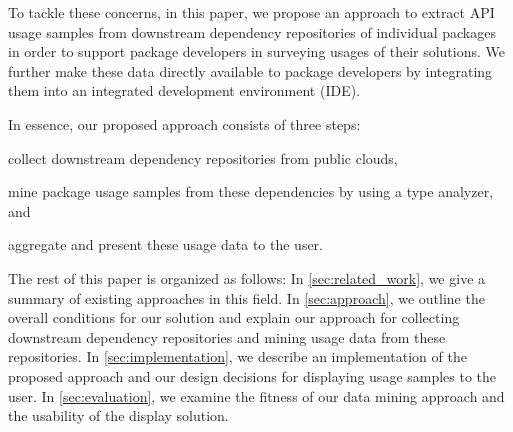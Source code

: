 To tackle these concerns, in this paper, we propose an approach to extract API usage samples from downstream dependency repositories of individual packages in order to support package developers in surveying usages of their solutions.
We further make these data directly available to package developers by integrating them into an integrated development environment (IDE).

In essence, our proposed approach consists of three steps:
\begin{enumerate*}[label=(\roman*)]
	\item collect downstream dependency repositories from public clouds,
	\item mine package usage samples from these dependencies by using a type analyzer,
	and \item aggregate and present these usage data to the user.
\end{enumerate*}

The rest of this paper is organized as follows:
In \cref{sec:related_work}, we give a summary of existing approaches in this field.
In \cref{sec:approach}, we outline the overall conditions for our solution and explain our approach for collecting downstream dependency repositories and mining usage data from these repositories.
In \cref{sec:implementation}, we describe an implementation of the proposed approach and our design decisions for displaying usage samples to the user.
In \cref{sec:evaluation}, we examine the fitness of our data mining approach and the usability of the display solution.
